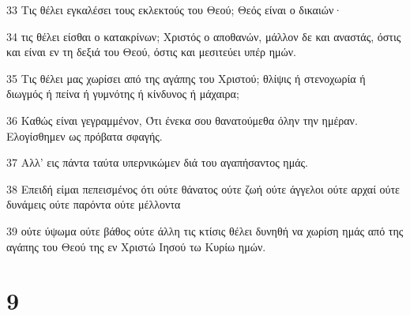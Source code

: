 \par 33 Τις θέλει εγκαλέσει τους εκλεκτούς του Θεού; Θεός είναι ο δικαιών·
\par 34 τις θέλει είσθαι ο κατακρίνων; Χριστός ο αποθανών, μάλλον δε και αναστάς, όστις και είναι εν τη δεξιά του Θεού, όστις και μεσιτεύει υπέρ ημών.
\par 35 Τις θέλει μας χωρίσει από της αγάπης του Χριστού; θλίψις ή στενοχωρία ή διωγμός ή πείνα ή γυμνότης ή κίνδυνος ή μάχαιρα;
\par 36 Καθώς είναι γεγραμμένον, Ότι ένεκα σου θανατούμεθα όλην την ημέραν. Ελογίσθημεν ως πρόβατα σφαγής.
\par 37 Αλλ' εις πάντα ταύτα υπερνικώμεν διά του αγαπήσαντος ημάς.
\par 38 Επειδή είμαι πεπεισμένος ότι ούτε θάνατος ούτε ζωή ούτε άγγελοι ούτε αρχαί ούτε δυνάμεις ούτε παρόντα ούτε μέλλοντα
\par 39 ούτε ύψωμα ούτε βάθος ούτε άλλη τις κτίσις θέλει δυνηθή να χωρίση ημάς από της αγάπης του Θεού της εν Χριστώ Ιησού τω Κυρίω ημών.

\chapter{9}

